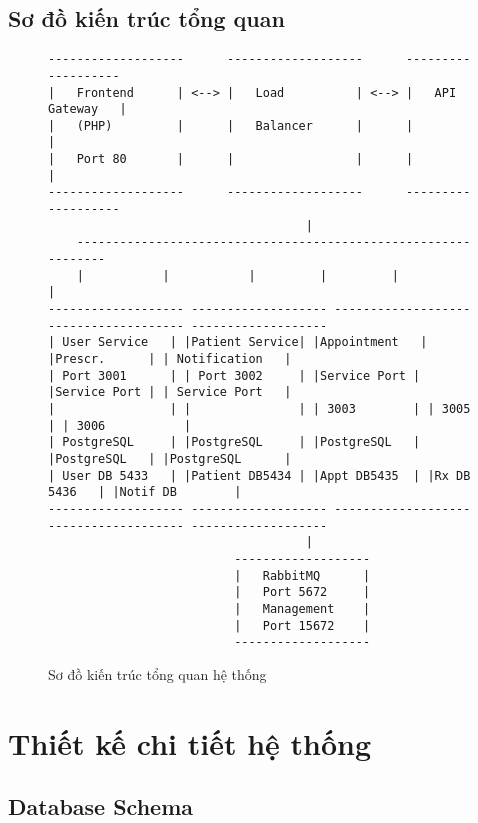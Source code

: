 \documentclass[12pt,a4paper]{report}
\begin{document}
\section{Sơ đồ kiến trúc tổng quan}

\begin{figure}[h!]
\centering
\begin{lstlisting}[language=text]
-------------------      -------------------      -------------------
|   Frontend      | <--> |   Load          | <--> |   API Gateway   |
|   (PHP)         |      |   Balancer      |      |                 |
|   Port 80       |      |                 |      |                 |
-------------------      -------------------      -------------------
                                    |
    ---------------------------------------------------------------
    |           |           |         |         |           |
------------------- ------------------- ------------------- ------------------- -------------------
| User Service   | |Patient Service| |Appointment   | |Prescr.      | | Notification   |
| Port 3001      | | Port 3002     | |Service Port | |Service Port | | Service Port   |
|                | |               | | 3003        | | 3005        | | 3006           |
| PostgreSQL     | |PostgreSQL     | |PostgreSQL   | |PostgreSQL   | |PostgreSQL      |
| User DB 5433   | |Patient DB5434 | |Appt DB5435  | |Rx DB 5436   | |Notif DB        |
------------------- ------------------- ------------------- ------------------- -------------------
                                    |
                          -------------------
                          |   RabbitMQ      |
                          |   Port 5672     |
                          |   Management    |
                          |   Port 15672    |
                          -------------------
\end{lstlisting}
\caption{Sơ đồ kiến trúc tổng quan hệ thống}
\end{figure}

\chapter{Thiết kế chi tiết hệ thống}

\section{Database Schema}
\end{document}
